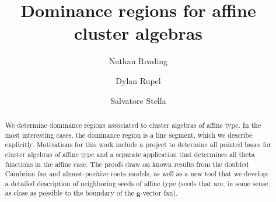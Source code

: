 \documentclass{amsart}
\author{Nathan Reading}
\author{Dylan Rupel}
\author{Salvatore Stella}
\title{Dominance regions for affine cluster algebras}
\theoremstyle{definition}
\theoremstyle{remark}
\numberwithin{equation}{section}
\newcommand{\0}{{\mathbf{0}}}
\newcommand{\g}{\mathbf{g}}
\begin{document}
\begin{abstract}
We determine dominance regions associated to cluster algebras of affine type.
In the most interesting cases, the dominance region is a line segment, which we describe explicitly.
Motivations for this work include a project to determine all pointed bases for cluster algebras of affine type and a separate application that determines all theta functions in the affine case.
The proofs draw on known results from the doubled Cambrian fan and almost-positive roots models, as well as a new tool that we develop: a detailed description of neighboring seeds of affine type (seeds that are, in some sense, as close as possible to the boundary of the $\g$-vector fan).
\end{abstract}

\maketitle


\setcounter{tocdepth}{2}
\tableofcontents
\end{document}

